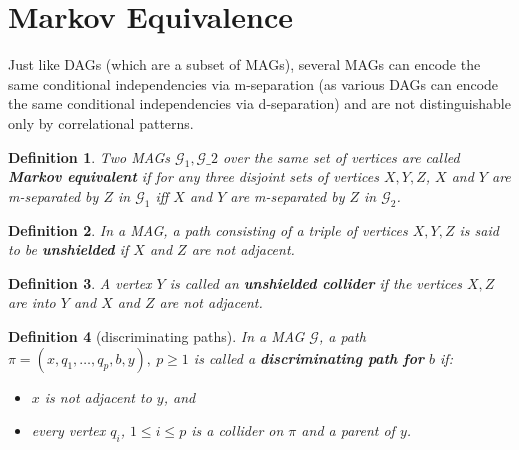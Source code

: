 \documentclass[a4paper]{article}
\newtheorem{definition}{Definition}
\begin{document}

\section{Markov Equivalence}

Just like DAGs (which are a subset of MAGs), several MAGs can encode the same conditional independencies via m-separation (as various DAGs can encode the same conditional independencies via d-separation) and are not distinguishable only by correlational patterns.

\begin{definition}Two MAGs $\mathcal{G}_1,\mathcal{G}\_2$ over the same set of vertices are called \textbf{Markov equivalent} if for any three
	disjoint sets of vertices $X,Y,Z$, $X$ and $Y$ are m-separated by $Z$ in $\mathcal{G}_1$ iff $X$ and $Y$ are m-separated by $Z$ in $\mathcal{G}_2$.
\end{definition}

\begin{definition}In a MAG, a path consisting of a triple of vertices $X,Y,Z$ is said to be \textbf{unshielded} if $X$ and $Z$ are not adjacent.
\end{definition}

\begin{definition}A vertex $Y$ is called an \textbf{unshielded collider} if the vertices $X, Z$ are into $Y$ and $X$ and $Z$ are not adjacent.
\end{definition}

\begin{definition}[discriminating paths]In a MAG $\mathcal{G}$, a path $\pi = (x, q_1,\ldots, q_p,b, y), ~p \geq 1$ is called a \textbf{discriminating path for} $b$ if:
	\begin{itemize}
		\item $x$ is not adjacent to $y$, and
		\item every vertex $q_i$, $1 \leq i \leq p$ is a collider on $\pi$ and a parent of $y$.
	\end{itemize}
\end{definition}
\end{document}
